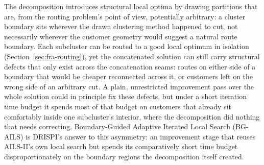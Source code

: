 The decomposition introduces structural local optima by drawing partitions that are, from the routing problem's point of view, potentially arbitrary: a cluster boundary sits wherever the drawn clustering method happened to cut, not necessarily wherever the customer geometry would suggest a natural route boundary. Each subcluster can be routed to a good local optimum in isolation (Section~\ref{sec:fra-routing}), yet the concatenated solution can still carry structural defects that only exist across the concatenation seams: routes on either side of a boundary that would be cheaper reconnected across it, or customers left on the wrong side of an arbitrary cut. A plain, unrestricted improvement pass over the whole solution could in principle fix these defects, but under a short iteration time budget it spends most of that budget on customers that already sit comfortably inside one subcluster's interior, where the decomposition did nothing that needs correcting. Boundary-Guided Adaptive Iterated Local Search (BG-AILS) is DRISPI's answer to this asymmetry: an improvement stage that reuses AILS-II's own local search but spends its comparatively short time budget disproportionately on the boundary regions the decomposition itself created.

